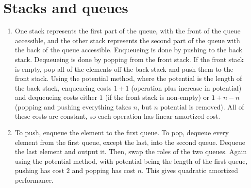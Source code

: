 \documentclass[11pt]{article}
\begin{document}
\section{Stacks and queues}
\begin{enumerate}
\item One stack represents the first part of the queue, with the front of the queue accessible, and the other stack represents the second part of the queue with the back of the queue accessible. Enqueueing is done by pushing to the back stack. Dequeueing is done by popping from the front stack. If the front stack is empty, pop all of the elements off the back stack and push them to the front stack. Using the potential method, where the potential is the length of the back stack, enqueueing costs \(1+1\) (operation plus increase in potential) and dequeueing costs either \(1\) (if the front stack is non-empty) or \(1+n-n\) (popping and pushing everything takes \(n\), but \(n\) potential is removed). All of these costs are constant, so each operation has linear amortized cost.
\item To push, enqueue the element to the first queue. To pop, dequeue every element from the first queue, except the last, into the second queue. Dequeue the last element and output it. Then, swap the roles of the two queues. Again using the potential method, with potential being the length of the first queue, pushing has cost \(2\) and popping has cost \(n\). This gives quadratic amortized performance.
\end{enumerate}
\end{document}
